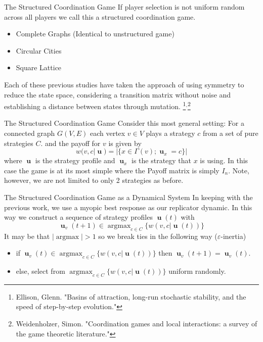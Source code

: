 \documentclass{beamer}
\DeclareMathOperator*{\argmax}{\text{argmax}}
\DeclareMathOperator{\uu}{\mathbf{u}}
\begin{document}
\begin{frame}{The Structured Coordination Game}
	If player selection is not uniform random across all players we call this a structured coordination game. 
	\begin{itemize}
		\item Complete Graphs (Identical to unstructured game)
		\item Circular Cities
		\item Square Lattice 
	\end{itemize}
	Each of these previous studies have taken the approach of using symmetry to reduce the state space, considering a transition matrix without noise and establishing a distance between states through mutation. \footnote{Ellison, Glenn. "Basins of attraction, long-run stochastic stability, and the speed of step-by-step evolution."}$^,$\footnote{Weidenholzer, Simon. "Coordination games and local interactions: a survey of the game theoretic literature."}
\end{frame}

\begin{frame}{The Structured Coordination Game}
	Consider this most general setting: For a connected graph $G(V,E)$ each vertex $v\in V$ plays a strategy $c$ from a set of pure strategies $C$. and the payoff for $v$ is given by \begin{equation}
		w(v,c|\uu)=|\{x\in \Gamma (v);\uu_x=c\}|
	\end{equation}
	where $\uu$ is the strategy profile and $\uu_x$ is the strategy that $x$ is using. 
	In this case the game is at its most simple where the Payoff matrix is simply $I_n$. Note, however, we are not limited to only 2 strategies as before. 
\end{frame}

\begin{frame}{The Structured Coordination Game as a Dynamical System}
	In keeping with the previous work, we use a myopic best response as our replicator dynamic. In this way we construct a sequence of strategy profiles $\uu(t)$ with 
	\begin{equation}
		\uu_v(t+1)\in \argmax_{c\in C}\{w(v,c|\uu(t))\}
	\end{equation}
It may be that $|\argmax|>1$ so we break ties in the following way ($\varepsilon$-inertia) 
\begin{itemize}
	\item if $\uu_v(t)\in \argmax_{c\in C}\{w(v,c|\uu(t))\}$ then $ \uu_v(t+1)=\uu_v(t)$.
	\item else, select from $\argmax_{c\in C}\{w(v,c|\uu(t))\}$ uniform randomly. 
	\end{itemize}
\end{frame}
\end{document}
